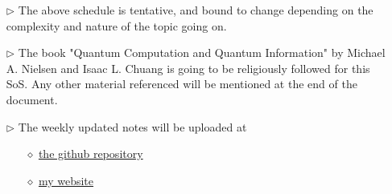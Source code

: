 \documentclass{package/notes}
\newcommand{\0}{\ket{0}}
\newcommand{\1}{\ket{1}}
\begin{document}
\vspace{5mm}
\begin{shaded}
\begin{itemize}
\item[$\rhd$] The above schedule is tentative, and bound to change depending on the complexity and nature of the topic going on.
    \item[$\rhd$] The book "Quantum Computation and Quantum Information" by Michael A. Nielsen and Isaac L. Chuang is going to be religiously followed for this SoS. Any other material referenced will be mentioned at the end of the document.
    \item[$\rhd$] The weekly updated notes will be uploaded at
    \begin{itemize}
        \item[$\diamond$] \href{https://github.com/EeshaanJain/Quantum-Computing}{the github repository}
        \item[$\diamond$]
        \href{https://eeshaanjain.github.io/quantum}{my website}
    \end{itemize}
\end{itemize}

\end{shaded}
\newpage


\newpage

 
\end{document}
